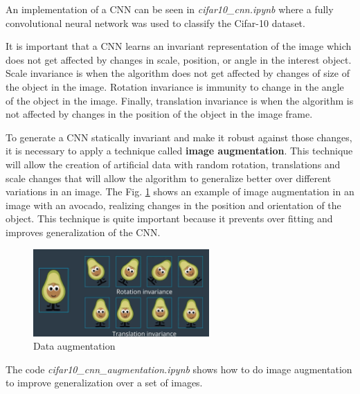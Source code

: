 \documentclass{article}
\begin{document}
An implementation of a CNN can be seen in \textit{cifar10\_cnn.ipynb} where a fully convolutional neural network was used to classify the Cifar-10 dataset.

It is important that a CNN learns an invariant representation of the image which does not get affected by changes in scale, position, or angle in the interest object. Scale invariance is when the algorithm does not get affected by changes of size of the object in the image. Rotation invariance is immunity to change in the angle of the object in the image. Finally, translation invariance is when the algorithm is not affected by changes in the position of the object in the image frame.

To generate a CNN statically invariant and make it robust against those changes, it is necessary to apply a technique called \textbf{image augmentation}. This technique will allow the creation of artificial data with random rotation, translations and scale changes that will allow the algorithm to generalize better over different variations in an image. The Fig. \ref{fig:f26} shows an example of image augmentation in an image with an avocado, realizing changes in the position and orientation of the object. This technique is quite important because it prevents over fitting and improves generalization of the CNN.

\begin{figure}[ht]
    \centering
    \includegraphics[width=0.6\textwidth,height=0.6\textheight,keepaspectratio]{images/augmentation.png}
    \captionsetup{justification=centering}
    \caption{Data augmentation}
    \label{fig:f26}
\end{figure}

The code \textit{cifar10\_cnn\_augmentation.ipynb} shows how to do image augmentation to improve generalization over a set of images.

\printbibliography
\end{document}

